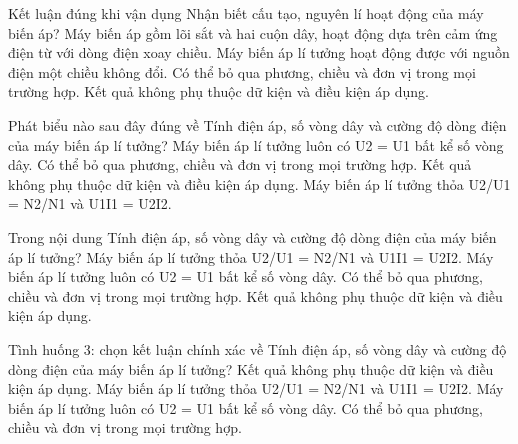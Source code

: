 \begin{ex}
Kết luận đúng khi vận dụng Nhận biết cấu tạo, nguyên lí hoạt động của máy biến áp?
\choice
{\True Máy biến áp gồm lõi sắt và hai cuộn dây, hoạt động dựa trên cảm ứng điện từ với dòng điện xoay chiều.}
{Máy biến áp lí tưởng hoạt động được với nguồn điện một chiều không đổi.}
{Có thể bỏ qua phương, chiều và đơn vị trong mọi trường hợp.}
{Kết quả không phụ thuộc dữ kiện và điều kiện áp dụng.}
\end{ex}

\begin{ex}
Phát biểu nào sau đây đúng về Tính điện áp, số vòng dây và cường độ dòng điện của máy biến áp lí tưởng?
\choice
{Máy biến áp lí tưởng luôn có U2 = U1 bất kể số vòng dây.}
{Có thể bỏ qua phương, chiều và đơn vị trong mọi trường hợp.}
{Kết quả không phụ thuộc dữ kiện và điều kiện áp dụng.}
{\True Máy biến áp lí tưởng thỏa U2/U1 = N2/N1 và U1I1 = U2I2.}
\end{ex}

\begin{ex}
Trong nội dung Tính điện áp, số vòng dây và cường độ dòng điện của máy biến áp lí tưởng?
\choice
{\True Máy biến áp lí tưởng thỏa U2/U1 = N2/N1 và U1I1 = U2I2.}
{Máy biến áp lí tưởng luôn có U2 = U1 bất kể số vòng dây.}
{Có thể bỏ qua phương, chiều và đơn vị trong mọi trường hợp.}
{Kết quả không phụ thuộc dữ kiện và điều kiện áp dụng.}
\end{ex}

\begin{ex}
Tình huống 3: chọn kết luận chính xác về Tính điện áp, số vòng dây và cường độ dòng điện của máy biến áp lí tưởng?
\choice
{Kết quả không phụ thuộc dữ kiện và điều kiện áp dụng.}
{\True Máy biến áp lí tưởng thỏa U2/U1 = N2/N1 và U1I1 = U2I2.}
{Máy biến áp lí tưởng luôn có U2 = U1 bất kể số vòng dây.}
{Có thể bỏ qua phương, chiều và đơn vị trong mọi trường hợp.}
\end{ex}

